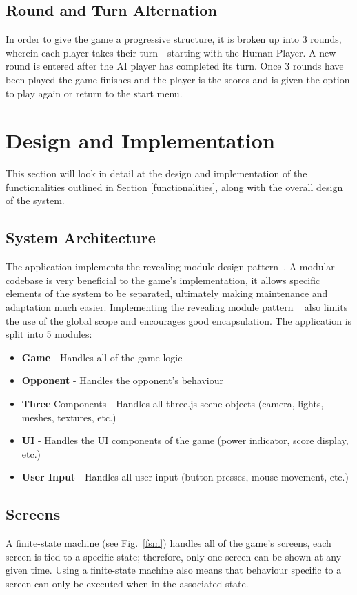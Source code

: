 \documentclass[runningheads]{llncs}
\begin{document}
	\subsection{Round and Turn Alternation}\label{turns}
	In order to give the game a progressive structure, it is broken up into 3 rounds, wherein each player takes their turn - starting with the Human Player. A new round is entered after the AI player has completed its turn. Once 3 rounds have been played the game finishes and the player is the scores and is given the option to play again or return to the start menu.
	
	\section{Design and Implementation} \label{implementation}
	This section will look in detail at the design and implementation of the functionalities outlined in Section \ref{functionalities}, along with the overall design of the system. 
	\subsection{System Architecture}
	The application implements the revealing module design pattern~\cite{ref_revealing-module-pattern}. A modular codebase is very beneficial to the game's implementation, it allows specific elements of the system to be separated, ultimately making maintenance and adaptation much easier. Implementing the revealing module pattern ~\cite{ref_revealing-module-pattern} also limits the use of the global scope and encourages good encapsulation. The application is split into 5 modules: 
	\begin{itemize}
		\item \textbf{Game} - Handles all of the game logic 
		\item \textbf{Opponent} - Handles the opponent's behaviour
		\item \textbf{Three} Components - Handles all three.js scene objects (camera, lights, meshes, textures, etc.)
		\item \textbf{UI} - Handles the UI components of the game (power indicator, score display, etc.)
		\item \textbf{User Input} - Handles all user input (button presses, mouse movement, etc.)
	\end{itemize}
	\subsection{Screens}
	A finite-state machine (see Fig.~\ref{fsm}) handles all of the game's screens, each screen is tied to a specific state; therefore, only one screen can be shown at any given time. Using a finite-state machine also means that behaviour specific to a screen can only be executed when in the associated state.
	
\end{document}
